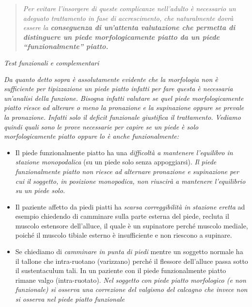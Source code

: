 \documentclass[]{article}
\begin{document}
\begin{quote}
\emph{Per evitare l'insorgere di queste complicanze nell'adulto è
necessario un \emph{adeguato trattamento in fase di accrescimento}, che
naturalmente dovrà essere la \textbf{\emph{conseguenza di un'attenta
valutazione che permetta di distinguere un piede morfologicamente piatto
da un piede ``funzionalmente'' piatto.}}}
\end{quote}

\emph{Test funzionali e complementari}

\emph{Da quanto detto sopra è assolutamente evidente che la morfologia
non è sufficiente per tipizzazione un piede piatto infatti per fare
questa è necessaria un'analisi della funzione. Bisogna infatti valutare
se quel piede morfologicamente piatto riesce ad alterare o meno la
pronazione e la supinazione oppure se prevale la pronazione. Infatti
solo il deficit funzionale giustifica il trattamento. Vediamo quindi
quali sono le prove necessarie per capire se un piede è solo
morfologicamente piatto oppure lo è anche funzionalmente:}

\begin{itemize}
\item
  Il piede funzionalmente piatto ha una \emph{difficoltà a mantenere
  l'equilibro in stazione monopodalica} (su un piede solo senza
  appoggiarsi). \emph{Il piede funzionalmente piatto non riesce ad
  alternare pronazione e supinazione per cui il soggetto, in posizione
  monopodica, non riuscirà a mantenere l'equilibrio su un piede solo.}
\item
  Il paziente affetto da piedi piatti ha \emph{scarsa correggibilità in
  stazione eretta} ad esempio chiedendo di camminare sulla parte esterna
  del piede, recluta il muscolo estensore dell'alluce, il quale è un
  supinatore perché muscolo mediale, poiché il muscolo tibiale esterno è
  insufficiente e non riescono a supinare.
\item
  Se chiediamo di \emph{camminare in punta di piedi} mentre un soggetto
  normale ha il tallone che intra-ruotano (varizzano) perché il flessore
  dell'alluce passa sotto il sustentaculum tali. In un paziente con il
  piede funzionalmente piatto rimane valgo (intra-ruotato). \emph{Nel
  soggetto con piede piatto morfologico (e non funzionale) si osserva
  una correzione del valgismo del calcagno che invece non si osserva nel
  piede piatto funzionale}
\end{itemize}
\end{document}

